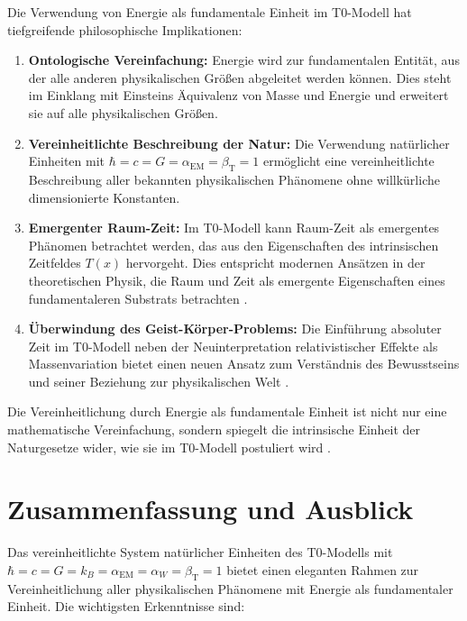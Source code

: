 \documentclass[12pt,a4paper]{article}
\newcommand{\Tfield}{T(x)}
\newcommand{\alphaEM}{\alpha_{\text{EM}}}
\newcommand{\betaT}{\beta_{\text{T}}}
\begin{document}
Die Verwendung von Energie als fundamentale Einheit im T0-Modell hat tiefgreifende philosophische Implikationen:

\begin{enumerate}
\item \textbf{Ontologische Vereinfachung:} Energie wird zur fundamentalen Entität, aus der alle anderen physikalischen Größen abgeleitet werden können. Dies steht im Einklang mit Einsteins Äquivalenz von Masse und Energie und erweitert sie auf alle physikalischen Größen.

\item \textbf{Vereinheitlichte Beschreibung der Natur:} Die Verwendung natürlicher Einheiten mit $\hbar = c = G = \alphaEM = \betaT = 1$ ermöglicht eine vereinheitlichte Beschreibung aller bekannten physikalischen Phänomene ohne willkürliche dimensionierte Konstanten.

\item \textbf{Emergenter Raum-Zeit:} Im T0-Modell kann Raum-Zeit als emergentes Phänomen betrachtet werden, das aus den Eigenschaften des intrinsischen Zeitfeldes $\Tfield$ hervorgeht. Dies entspricht modernen Ansätzen in der theoretischen Physik, die Raum und Zeit als emergente Eigenschaften eines fundamentaleren Substrats betrachten \cite{pascher_perspective_2025, pascher_zeit_2025}.

\item \textbf{Überwindung des Geist-Körper-Problems:} Die Einführung absoluter Zeit im T0-Modell neben der Neuinterpretation relativistischer Effekte als Massenvariation bietet einen neuen Ansatz zum Verständnis des Bewusstseins und seiner Beziehung zur physikalischen Welt \cite{pascher_perspective_2025}.
\end{enumerate}

Die Vereinheitlichung durch Energie als fundamentale Einheit ist nicht nur eine mathematische Vereinfachung, sondern spiegelt die intrinsische Einheit der Naturgesetze wider, wie sie im T0-Modell postuliert wird \cite{pascher_dualismus_2025}.

\section{Zusammenfassung und Ausblick}

Das vereinheitlichte System natürlicher Einheiten des T0-Modells mit $\hbar = c = G = k_B = \alphaEM = \alpha_W = \betaT = 1$ bietet einen eleganten Rahmen zur Vereinheitlichung aller physikalischen Phänomene mit Energie als fundamentaler Einheit. Die wichtigsten Erkenntnisse sind:
\end{document}
